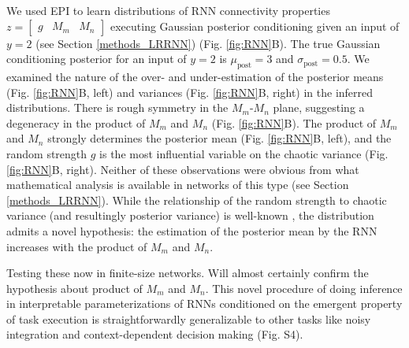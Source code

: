 \documentclass[11pt]{article}
\begin{document}
We used EPI to learn distributions of RNN connectivity properties $z = \begin{bmatrix} g & M_m & M_n \end{bmatrix}$ executing Gaussian posterior conditioning given an input of $y=2$ (see Section \ref{methods_LRRNN}) (Fig. \ref{fig:RNN}B). The true Gaussian conditioning posterior for an input of $y=2$ is $\mu_{\text{post}}=3$ and $\sigma_{\text{post}} = 0.5$.   We examined the nature of the over- and under-estimation of the posterior means (Fig. \ref{fig:RNN}B, left) and variances (Fig. \ref{fig:RNN}B, right) in the inferred distributions.  There is rough symmetry in the $M_m$-$M_n$ plane, suggesting a degeneracy in the product of $M_m$ and $M_n$ (Fig. \ref{fig:RNN}B).  
The product of $M_m$ and $M_n$ strongly determines the posterior mean (Fig. \ref{fig:RNN}B, left), and the random strength $g$ is the most influential variable on the chaotic variance (Fig. \ref{fig:RNN}B, right).
Neither of these observations were obvious from what mathematical analysis is available in networks of this type (see Section \ref{methods_LRRNN}).  While the relationship of the random strength to chaotic variance (and resultingly posterior variance) is well-known \cite{sompolinsky1988chaos}, the distribution admits a novel hypothesis: the estimation of the posterior mean by the RNN increases with the product of $M_m$ and $M_n$.

Testing these now in finite-size networks.  Will almost certainly confirm the hypothesis about product of $M_m$ and $M_n$.
This novel procedure of doing inference in interpretable parameterizations of RNNs conditioned on the emergent property of task execution is straightforwardly generalizable to other tasks like noisy integration and context-dependent decision making (Fig. S4).
\end{document}
